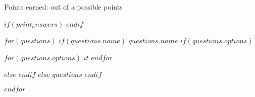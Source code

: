 \documentclass{exam}
\begin{document}
\pagestyle{headandfoot}
\firstpagefooter{}{}{}
\runningfooter{}
{}
{Points earned: \makebox[1in]{\hrulefill}
out of a possible \pointsonpage{\thepage} points}
\runningfootrule

\begin{center}
\end{center}

\vspace{0.1in}

$if(print_answers)$
\printanswers
$endif$
\vspace{0.2in}

\begin{questions}
$for(questions)$
    $if(questions.name)$
        \question[1] $questions.name$
        $if(questions.options)$
            \begin{checkboxes}
            $for(questions.options)$
                {\CorrectChoice \hspace{1cm} }
                {\choice $it$}
            $endfor$
            \end{checkboxes}
        $else$
        \vspace{1in}
        $endif$
        $else$
        $questions$
    $endif$

$endfor$

\end{questions}
\end{document}
